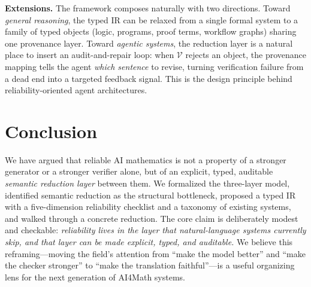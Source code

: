 \documentclass[11pt]{article}
\newcommand{\VV}{\mathcal{V}}
\begin{document}
\textbf{Extensions.} The framework composes naturally with two directions. Toward \emph{general reasoning}, the typed IR can be relaxed from a single formal system to a family of typed objects (logic, programs, proof terms, workflow graphs) sharing one provenance layer. Toward \emph{agentic systems}, the reduction layer is a natural place to insert an audit-and-repair loop: when $\VV$ rejects an object, the provenance mapping tells the agent \emph{which sentence} to revise, turning verification failure from a dead end into a targeted feedback signal. This is the design principle behind reliability-oriented agent architectures.

\section{Conclusion}
We have argued that reliable AI mathematics is not a property of a stronger generator or a stronger verifier alone, but of an explicit, typed, auditable \emph{semantic reduction layer} between them. We formalized the three-layer model, identified semantic reduction as the structural bottleneck, proposed a typed IR with a five-dimension reliability checklist and a taxonomy of existing systems, and walked through a concrete reduction. The core claim is deliberately modest and checkable: \emph{reliability lives in the layer that natural-language systems currently skip, and that layer can be made explicit, typed, and auditable.} We believe this reframing---moving the field's attention from ``make the model better'' and ``make the checker stronger'' to ``make the translation faithful''---is a useful organizing lens for the next generation of AI4Math systems.



\end{document}
